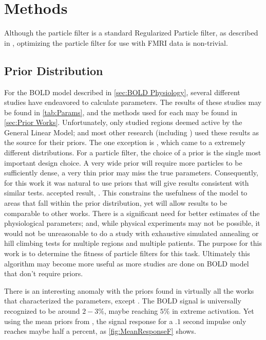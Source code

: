 \chapter{Methods}
\label{sec:Methods}
Although the particle filter  is a standard Regularized
Particle filter, as described in \cite{Arulampalam2002a}, optimizing the 
particle filter for use with FMRI data is non-trivial. 

\section{Prior Distribution}
\label{sec:PriorDist}
For the BOLD model described in \autoref{sec:BOLD Physiology}, several
different studies have endeavored to calculate parameters. The results
of these studies may be found in \autoref{tab:Params}, and the methods 
used for each may be found in \autoref{sec:Prior Works}. Unfortunately,
\cite{Friston2000} only studied regions deemed active by the General 
Linear Model; and most other research (including \cite{Friston2001}) used these results as 
the source for their priors. 
The one exception is \cite{Johnston2008}, which came to a extremely different
distributions. For a particle filter, the choice of a prior is
the single most important design choice. A very wide prior will require
more particles to be sufficiently dense, a very thin prior may miss
the true parameters. Consequently, for this work it was natural
to use priors that will give results consistent with similar tests. accepted result,
\cite{Friston2000}. This constrains the usefulness of the model to
areas that fall within the prior distribution, yet will allow results
to be comparable to other works. There is a significant need for better
estimates of the physiological parameters; and, while physical experiments
may not be possible, it would not be unreasonable to do a study with
exhaustive simulated annealing or hill climbing tests for multiple
regions and multiple patients. The purpose for this work is to determine
the fitness of particle filters for this task. Ultimately this algorithm may become
more useful as more studies are done on BOLD model that don't require
priors. 

There is an interesting anomaly with the priors found in virtually all
the works that characterized the parameters, except \cite{Johnston2008}.
The BOLD signal is universally recognized to be around $2-3\%$, maybe
reaching $5\%$ in extreme activation. Yet using the mean priors
from \cite{Friston2000}, the signal response for a $.1$ second
impulse only reaches maybe half a percent, as \autoref{fig:MeanResponseF}
shows.

